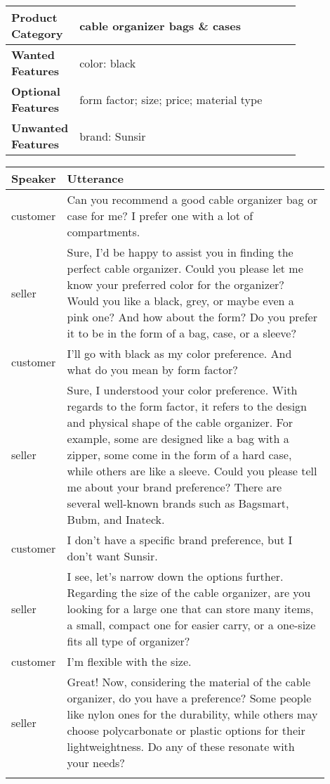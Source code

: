 \begin{table*}[t]
\small
\begin{center}
    \begin{tabular}{l p{0.82\linewidth} }
    \hline
    \textbf{Product Category} & cable organizer bags \& cases \\ \hline
    \textbf{Wanted Features} & color: black \\ \hline
    \textbf{Optional Features} & form factor; size; price; material type \\ \hline
    \textbf{Unwanted Features} & brand: Sunsir \\ \hline 
    \end{tabular}
    \begin{tabular}{l p{0.9\linewidth} }
    \hline
    \textbf{Speaker} & \textbf{Utterance} \\
    \hline
    customer& Can you recommend a good cable organizer bag or case for me? I prefer one with a lot of compartments. \\ \hdashline
    seller& Sure, I'd be happy to assist you in finding the perfect cable organizer. Could you please let me know your preferred color for the organizer? Would you like a black, grey, or maybe even a pink one? And how about the form? Do you prefer it to be in the form of a bag, case, or a sleeve?\\ \hdashline
    customer& I'll go with black as my color preference. And what do you mean by form factor?\\ \hdashline
    seller& Sure, I understood your color preference. With regards to the form factor, it refers to the design and physical shape of the cable organizer. For example, some are designed like a bag with a zipper, some come in the form of a hard case, while others are like a sleeve. Could you please tell me about your brand preference? There are several well-known brands such as Bagsmart, Bubm, and Inateck.\\\hdashline
    customer& I don't have a specific brand preference, but I don't want Sunsir.\\\hdashline
    seller& I see, let's narrow down the options further. Regarding the size of the cable organizer, are you looking for a large one that can store many items, a small, compact one for easier carry, or a one-size fits all type of organizer?\\\hdashline
    customer& I'm flexible with the size.\\\hdashline
    seller& Great! Now, considering the material of the cable organizer, do you have a preference? Some people like nylon ones for the durability, while others may choose polycarbonate or plastic options for their lightweightness. Do any of these resonate with your needs?\\\hdashline

\end{tabular}
\end{center}
\end{table*}
